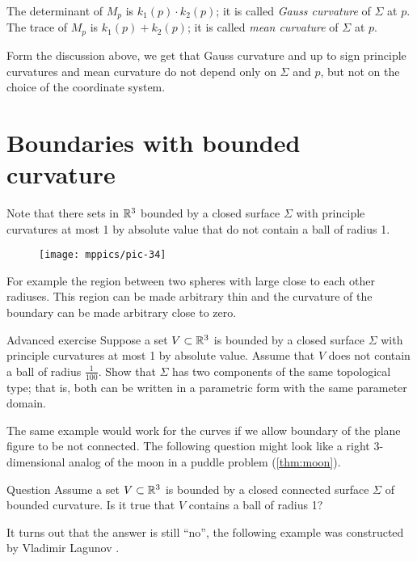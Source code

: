 The determinant of $M_p$ is $k_1(p)\cdot k_2(p)$;
it is called \emph{Gauss curvature} of $\Sigma$ at $p$.
The trace of $M_p$ is $k_1(p)+ k_2(p)$;
it is called \emph{mean curvature} of $\Sigma$ at $p$.

Form the discussion above, 
we get that Gauss curvature and up to sign principle curvatures and mean curvature 
do not depend only on $\Sigma$ and $p$,
but not on the choice of the coordinate system.

\section{Boundaries with bounded curvature}

Note that there sets in $\mathbb{R}^3$ bounded by a closed surface $\Sigma$ with principle curvatures at most 1 by absolute value
that do not contain a ball of radius 1.

\begin{wrapfigure}{r}{33 mm}
\vskip-4mm
\centering
\texttt{[image: mppics/pic-34]}
\vskip0mm
\end{wrapfigure}

For example the region between two spheres with large close to each other radiuses. 
This region can be made arbitrary thin and the curvature of the boundary can be made arbitrary close to zero.

\begin{thm}{Advanced exercise}
Suppose a set $V\subset \mathbb{R}^3$ is bounded by a closed surface $\Sigma$ with principle curvatures at most 1 by absolute value.
Assume that $V$ does not contain a ball of radius $\tfrac1{100}$.
Show that $\Sigma$ has two components of the same topological type; 
that is, both can be written in a parametric form with the same parameter domain. 
\end{thm}


The same example would work for the curves if we allow boundary of the plane figure to be not connected.
The following question might look like a right 3-dimensional analog of the moon in a puddle problem (\ref{thm:moon}).


\begin{thm}{Question}
Assume a set $V\subset \mathbb{R}^3$ is bounded by a closed connected surface $\Sigma$ of bounded curvature.
Is it true that $V$ contains a ball of radius 1?
\end{thm}

It turns out that the answer is still ``no'', the following example was constructed by Vladimir Lagunov \cite{lagunov}.

